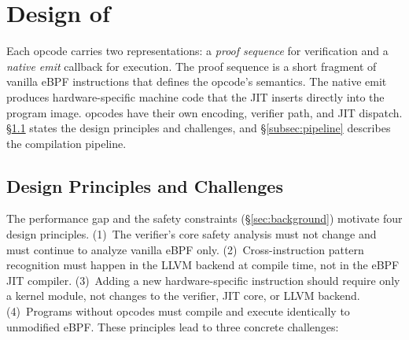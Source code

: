 




\section{Design of \lang}
\label{sec:design}

Each \lang opcode carries two representations: a \emph{proof sequence} for verification and a \emph{native emit} callback for execution. The proof sequence is a short fragment of vanilla eBPF instructions that defines the opcode's semantics. The native emit produces hardware-specific machine code that the JIT inserts directly into the program image. \lang opcodes have their own encoding, verifier path, and JIT dispatch. \S\ref{subsec:principles} states the design principles and challenges, and \S\ref{subsec:pipeline} describes the compilation pipeline.

\subsection{Design Principles and Challenges}
\label{subsec:principles}

The performance gap and the safety constraints (\S\ref{sec:background}) motivate four design principles. (1)~The verifier's core safety analysis must not change and must continue to analyze vanilla eBPF only. (2)~Cross-instruction pattern recognition must happen in the LLVM backend at compile time, not in the eBPF JIT compiler. (3)~Adding a new hardware-specific instruction should require only a kernel module, not changes to the verifier, JIT core, or LLVM backend. (4)~Programs without \lang opcodes must compile and execute identically to unmodified eBPF.
%
These principles lead to three concrete challenges:


